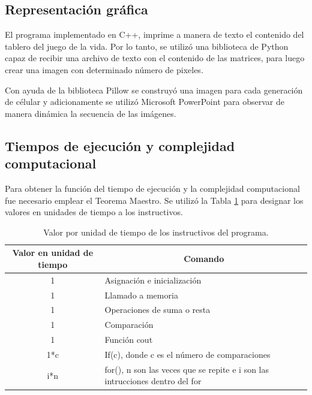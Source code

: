 \documentclass[12pt,letterpaper]{article}
\begin{document}
\subsection{Representación gráfica}
El programa implementado en C++, imprime a manera de texto el contenido del tablero del juego de la vida. Por lo tanto, se utilizó una biblioteca de Python capaz de recibir una archivo de texto con el contenido de las matrices, para luego crear una imagen con determinado número de pixeles. 

Con ayuda de la biblioteca Pillow se construyó una imagen para cada generación de célular y adicionamente se utilizó Microsoft PowerPoint para observar de manera dinámica la secuencia de las imágenes.

\subsection{Tiempos de ejecución y complejidad computacional}
Para obtener la función del tiempo de ejecución y la complejidad computacional fue necesario emplear el Teorema Maestro. Se utilizó la Tabla \ref{tabtiempo} para designar los valores en unidades de tiempo a los instructivos.

\begin{table}[H]
\centering
\caption{Valor por unidad de tiempo de los instructivos del programa.}
\label{tabtiempo}
\begin{tabular}{|c|l|}
\hline 
\textbf{Valor en unidad de tiempo} & \multicolumn{1}{c|}{\textbf{Comando}}                \\ \hline
1                                  & Asignación e inicialización                                                  \\ \hline
1                                  & Llamado a memoria                                                            \\ \hline
1                                  & Operaciones de suma o resta                          \\ \hline
1                                  & Comparación                                                                  \\ \hline
1                                  & Función cout                                                               \\ \hline
1*c                                & If(c), donde c es el número de comparaciones                                 \\ \hline
i*n                                & for(), n son las veces que se repite e i son las intrucciones dentro del for \\ \hline
\end{tabular}
\end{table}
\end{document}
